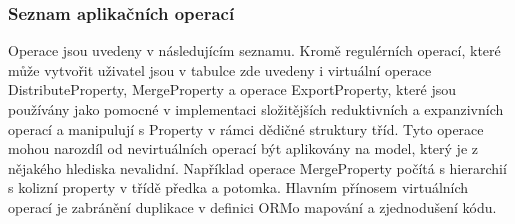\documentclass[11pt,twoside,a4paper]{book}
\begin{document}
\subsubsection{Seznam aplikačních operací}

Operace jsou uvedeny v následujícím seznamu. Kromě regulérních operací, které
může vytvořit uživatel jsou v tabulce zde uvedeny i virtuální operace
DistributeProperty, MergeProperty a operace ExportProperty, které jsou
používány jako pomocné v implementaci složitějších reduktivních a expanzivních
operací a manipulují s Property v rámci dědičné struktury tříd. Tyto operace
mohou narozdíl od nevirtuálních operací být aplikovány na model, který je z
nějakého hlediska nevalidní. Například operace MergeProperty počítá s
hierarchií s kolizní property v třídě předka a potomka. Hlavním přínosem
virtuálních operací je zabránění duplikace v definici ORMo mapování a
zjednodušení kódu.
\end{document}

